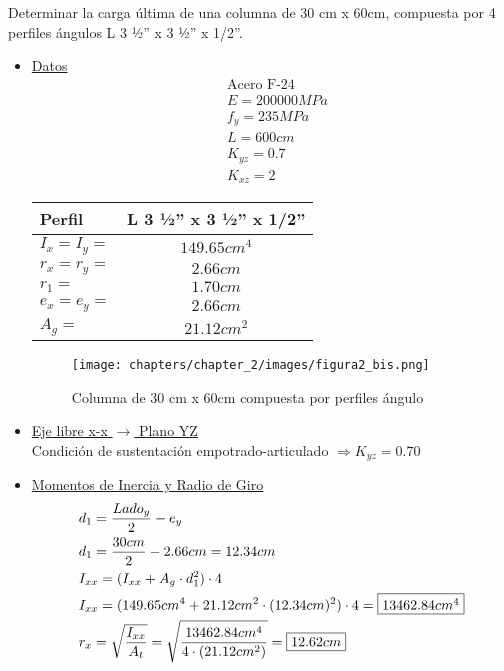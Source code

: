 \item Determinar la carga última de una columna de 30 cm x 60cm, compuesta por 4 perfiles ángulos L 3 ½” x 3 ½” x 1/2”.
\begin{itemize}
\item \underline{Datos}
\begin{align*}
& \text{Acero F-24}\\
& E = 200000MPa\\
& f_y = 235MPa\\
& L = 600cm\\
& K_{yz} = 0.7\\
& K_{xz} = 2
\end{align*}
\begin{table}[H]
  \begin{center}
    \begin{tabular}{l|c} %
      Perfil & L 3 ½” x 3 ½” x 1/2”\\
      \hline
      $I_x = I_y =$ & $149.65cm^4$ \\
      $r_x = r_y =$ & $2.66cm$ \\
      $r_1 =$ & $1.70cm$ \\
      $e_x = e_y =$ & $2.66cm$ \\
      $A_g =$ & $21.12cm^2$ \\
     
    \end{tabular}
  \end{center}
\end{table}

\begin{figure}[H]
\begin{center}
     \texttt{[image: chapters/chapter\_2/images/figura2\_bis.png]}
\end{center}
\caption{Columna de 30 cm x 60cm compuesta por perfiles ángulo}
\end{figure}

\newpage
\item \underline{Eje libre x-x $\rightarrow$ Plano YZ}\\
Condición de sustentación empotrado-articulado $\Rightarrow K_{yz} = 0.70$

\item \underline{Momentos de Inercia y Radio de Giro}
\begin{align*}
& d_1 = \frac{Lado_y}{2} - e_y \\
& d_1 = \frac{30cm}{2} - 2.66cm = 12.34cm\\
& I_{xx} = (I_{xx}+A_g \cdot d_1^2) \cdot 4\\
& I_{xx} = (149.65cm^4+21.12cm^2 \cdot (12.34cm)^2) \cdot 4 = \framebox{$13462.84cm^4$}\\
& r_x = \sqrt{\frac{I_{xx}}{A_t}} = \sqrt{\frac{13462.84cm^4}{4\cdot(21.12cm^2)}} = \framebox{$12.62cm$}
\end{align*}


\end{itemize}
